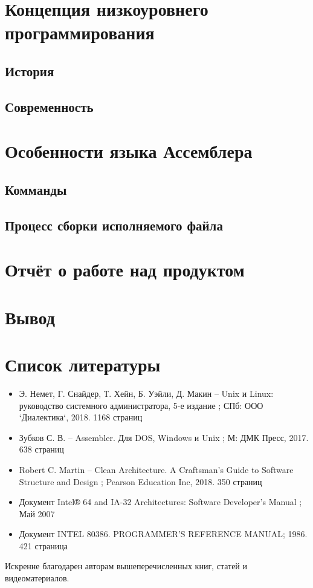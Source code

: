 \documentclass[a4paper]{article}
\begin{document}
\section{Концепция низкоуровнего программирования}
	\subsection{История}
	\subsection{Современность}
\section{Особенности языка Ассемблера}
	\subsection{Комманды}
	\subsection{Процесс сборки исполняемого файла}
\section{Отчёт о работе над продуктом}
\pagebreak
\section{Вывод}
\pagebreak
\section{Список литературы}
	\begin{itemize}
		\item Э. Немет, Г. Снайдер, Т. Хейн, Б. Уэйли, Д. Макин --
			\flqq{}Unix и Linux: руководство системного
			администратора, 5-е издание \frqq{}; СПб: ООО
			`Диалектика`, 2018. 1168 страниц
		\item Зубков С. В. -- \flqq{}Assembler. Для DOS, Windows и
			Unix \frqq{}; М: ДМК Пресс, 2017. 638 страниц
		\item Robert C. Martin -- \flqq{}Clean Architecture. A Craftsman's
			Guide to Software Structure and Design \frqq{}; Pearson
			Education Inc, 2018. 350 страниц
		\item Документ \flqq{}Intel® 64 and IA-32 Architectures:
			Software Developer’s Manual \frqq{}; Май 2007
		\item Документ \flqq{} INTEL 80386. PROGRAMMER'S REFERENCE
		MANUAL\frqq{}; 1986. 421 страница
	\end{itemize}
	Искренне благодарен авторам вышеперечисленных книг, статей и
	видеоматериалов.
\end{document}
